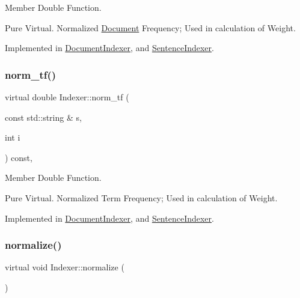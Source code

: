 Member Double Function. 

Pure Virtual. Normalized \hyperlink{class_document}{Document} Frequency; Used in calculation of Weight. 

Implemented in \hyperlink{class_document_indexer_a1c366e241572edc6e1d256db906cac43}{Document\+Indexer}, and \hyperlink{class_sentence_indexer_a646014181566f20140cee5dbd16f52fa}{Sentence\+Indexer}.

\mbox{\label{class_indexer_aadcdca40938d27c465e564ac8852f02d}} 
\subsubsection{\texorpdfstring{norm\+\_\+tf()}{norm\_tf()}}
{\footnotesize\ttfamily virtual double Indexer\+::norm\+\_\+tf (\begin{DoxyParamCaption}\item[{const std\+::string \&}]{s,  }\item[{int}]{i }\end{DoxyParamCaption}) const\hspace{0.3cm}{\ttfamily [protected]}, {}}



Member Double Function. 

Pure Virtual. Normalized Term Frequency; Used in calculation of Weight. 

Implemented in \hyperlink{class_document_indexer_a91cbacd5c82134b2ba6ab79e06fa4a60}{Document\+Indexer}, and \hyperlink{class_sentence_indexer_ada837ec334535e133c9ec511b369abfa}{Sentence\+Indexer}.

\mbox{\label{class_indexer_a84f50c7bac96cd5a8daa18899a39bb5d}} 
\subsubsection{\texorpdfstring{normalize()}{normalize()}}
{\footnotesize\ttfamily virtual void Indexer\+::normalize (\begin{DoxyParamCaption}{ }\end{DoxyParamCaption})\hspace{0.3cm}{\ttfamily [pure virtual]}}



